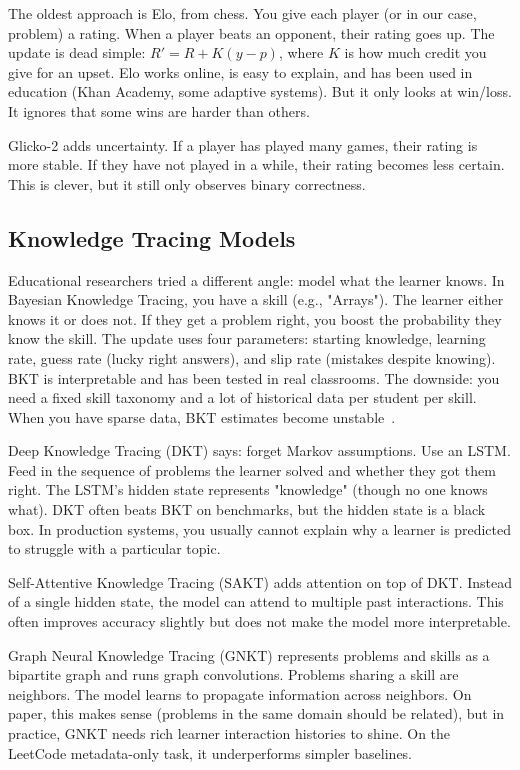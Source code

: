 \documentclass[conference]{IEEEtran}
\begin{document}
The oldest approach is Elo, from chess. You give each player (or in our case, problem) a rating. When a player beats an opponent, their rating goes up. The update is dead simple: $R' = R + K(y - p)$, where $K$ is how much credit you give for an upset. Elo works online, is easy to explain, and has been used in education (Khan Academy, some adaptive systems). But it only looks at win/loss. It ignores that some wins are harder than others.

Glicko-2 adds uncertainty. If a player has played many games, their rating is more stable. If they have not played in a while, their rating becomes less certain. This is clever, but it still only observes binary correctness.

\subsection{Knowledge Tracing Models}

Educational researchers tried a different angle: model what the learner knows. In Bayesian Knowledge Tracing, you have a skill (e.g., "Arrays"). The learner either knows it or does not. If they get a problem right, you boost the probability they know the skill. The update uses four parameters: starting knowledge, learning rate, guess rate (lucky right answers), and slip rate (mistakes despite knowing). BKT is interpretable and has been tested in real classrooms. The downside: you need a fixed skill taxonomy and a lot of historical data per student per skill. When you have sparse data, BKT estimates become unstable~\cite{corbett1994bkt,waters2015bkt_limitations}.

Deep Knowledge Tracing (DKT) says: forget Markov assumptions. Use an LSTM. Feed in the sequence of problems the learner solved and whether they got them right. The LSTM's hidden state represents "knowledge" (though no one knows what). DKT often beats BKT on benchmarks, but the hidden state is a black box. In production systems, you usually cannot explain why a learner is predicted to struggle with a particular topic.

Self-Attentive Knowledge Tracing (SAKT) adds attention on top of DKT. Instead of a single hidden state, the model can attend to multiple past interactions. This often improves accuracy slightly but does not make the model more interpretable.

Graph Neural Knowledge Tracing (GNKT) represents problems and skills as a bipartite graph and runs graph convolutions. Problems sharing a skill are neighbors. The model learns to propagate information across neighbors. On paper, this makes sense (problems in the same domain should be related), but in practice, GNKT needs rich learner interaction histories to shine. On the LeetCode metadata-only task, it underperforms simpler baselines.
\end{document}
